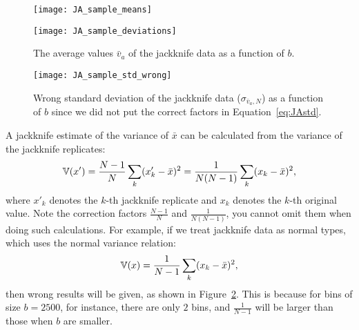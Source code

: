 \begin{figure}
    \centering
    \begin{minipage}[t]{0.8\linewidth}
        \centering
        \texttt{[image: JA\_sample\_means]}
        \label{fig:JA_sample_means:a}
    \end{minipage}
    \hfill
    \begin{minipage}[t]{0.8\linewidth}
        \centering
        \texttt{[image: JA\_sample\_deviations]}
        \label{fig:JA_sample_means:b}
    \end{minipage}
    \caption{The average values \(\bar{v}_a\) of the jackknife data as a function of \(b\).}
    \label{fig:JA_sample_means}
\end{figure}

\begin{figure}
    \centering
    \texttt{[image: JA\_sample\_std\_wrong]}
    \caption{Wrong standard deviation of the jackknife data (\(\sigma_{\bar{v}_a,N}\)) as a
        function of \(b\) since we did not put the correct factors in
        Equation~\eqref{eq:JAstd}.}
    \label{fig:JA_sample_std_wrong}
\end{figure}

A jackknife estimate of the variance of \(\bar{x}\) can be calculated from the variance of
the jackknife replicates:
%
\begin{equation}\label{eq:JAstd}
    \mathbb{V}(x') = \frac{ N - 1 }{ N } \sum_k (x_k' - \bar{x})^2
    = \frac{ 1 }{ N (N - 1) } \sum_k (x_k - \bar{x})^2,
\end{equation}
%
where \(x'_k\) denotes the \(k\)-th jackknife replicate and \(x_k\) denotes the \(k\)-th
original value.
Note the correction factors \(\frac{ N - 1 }{ N }\) and \(\frac{ 1 }{ N (N - 1) }\),
you cannot omit them when doing such calculations. For example, if we treat
jackknife data as normal  types, which uses the normal variance relation:
%
\begin{equation}
    \mathbb{V}(x) = \frac{ 1 }{ N - 1 } \sum_k (x_k - \bar{x})^2,
\end{equation}
%
then wrong results will be given, as shown in Figure~\ref{fig:JA_sample_std_wrong}.
This is because for bins of size \(b=2500\), for instance, there are only \(2\)
bins, and \(\frac{ 1 }{ N - 1 }\) will be larger than those when \(b\) are smaller.

